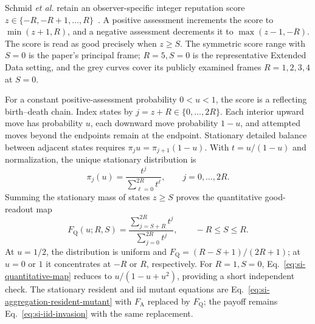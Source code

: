 \documentclass[fleqn,10pt]{wlscirep}
\begin{document}
Schmid \textit{et al.} retain an observer-specific integer reputation score $z\in\{-R,-R+1,\ldots,R\}$~\cite{si-schmid2023}. A positive assessment increments the score to $\min(z+1,R)$, and a negative assessment decrements it to $\max(z-1,-R)$. The score is read as good precisely when $z\geq S$. The symmetric score range with $S=0$ is the paper's principal frame; $R=5,S=0$ is the representative Extended Data setting, and the grey curves cover its publicly examined frames $R=1,2,3,4$ at $S=0$.

For a constant positive-assessment probability $0<u<1$, the score is a reflecting birth--death chain. Index states by $j=z+R\in\{0,\ldots,2R\}$. Each interior upward move has probability $u$, each downward move probability $1-u$, and attempted moves beyond the endpoints remain at the endpoint. Stationary detailed balance between adjacent states requires $\pi_j u=\pi_{j+1}(1-u)$. With $t=u/(1-u)$ and normalization, the unique stationary distribution is
\begin{equation}
\pi_j(u)=\frac{t^j}{\sum_{\ell=0}^{2R}t^\ell},
\qquad j=0,\ldots,2R.
\label{eq:si-quantitative-stationary}
\end{equation}
Summing the stationary mass of states $z\geq S$ proves the quantitative good-readout map
\begin{equation}
F_{\mathrm Q}(u;R,S)
=\frac{\sum_{j=S+R}^{2R}t^j}{\sum_{j=0}^{2R}t^j},
\qquad -R\leq S\leq R.
\label{eq:si-quantitative-map}
\end{equation}
At $u=1/2$, the distribution is uniform and $F_{\mathrm Q}=(R-S+1)/(2R+1)$; at $u=0$ or $1$ it concentrates at $-R$ or $R$, respectively. For $R=1,S=0$, Eq.~\eqref{eq:si-quantitative-map} reduces to $u/(1-u+u^2)$, providing a short independent check. The stationary resident and iid mutant equations are Eq.~\eqref{eq:si-aggregation-resident-mutant} with $F_{\mathrm A}$ replaced by $F_{\mathrm Q}$; the payoff remains Eq.~\eqref{eq:si-iid-invasion} with the same replacement.
\end{document}
